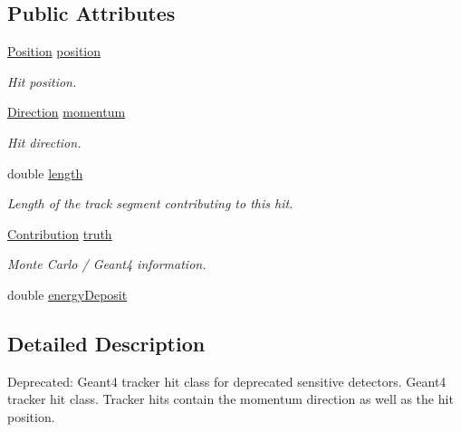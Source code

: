 \subsection*{Public Attributes}
\begin{DoxyCompactItemize}
\item 
\hyperlink{namespace_d_d4hep_1_1_simulation_ad6fd94b3439e31d1ba4b2e640d578558}{Position} \hyperlink{class_d_d4hep_1_1_simulation_1_1_geant4_tracker_hit_a76e77eb92142c6f794ac37b6471df512}{position}
\begin{DoxyCompactList}\small\item\em Hit position. \item\end{DoxyCompactList}\item 
\hyperlink{namespace_d_d4hep_1_1_simulation_a4b5bfd838293f3222b9d004c7dd1d6b3}{Direction} \hyperlink{class_d_d4hep_1_1_simulation_1_1_geant4_tracker_hit_a134e45be8162d17fc85e1a0c5f8b7e52}{momentum}
\begin{DoxyCompactList}\small\item\em Hit direction. \item\end{DoxyCompactList}\item 
double \hyperlink{class_d_d4hep_1_1_simulation_1_1_geant4_tracker_hit_a71b52bb59bc3f9a54d50c925f92027a5}{length}
\begin{DoxyCompactList}\small\item\em Length of the track segment contributing to this hit. \item\end{DoxyCompactList}\item 
\hyperlink{struct_d_d4hep_1_1_simulation_1_1_geant4_hit_1_1_monte_carlo_contrib}{Contribution} \hyperlink{class_d_d4hep_1_1_simulation_1_1_geant4_tracker_hit_a154bd6a86c7e962c8e6bb4b010318a45}{truth}
\begin{DoxyCompactList}\small\item\em Monte Carlo / Geant4 information. \item\end{DoxyCompactList}\item 
double \hyperlink{class_d_d4hep_1_1_simulation_1_1_geant4_tracker_hit_a0af1fbbb8d345344c088b8596b97998f}{energyDeposit}
\end{DoxyCompactItemize}


\subsection{Detailed Description}
Deprecated: Geant4 tracker hit class for deprecated sensitive detectors. Geant4 tracker hit class. Tracker hits contain the momentum direction as well as the hit position.

